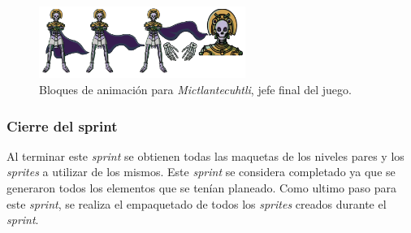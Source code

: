 \begin{figure}[h]
	\centering
	\includegraphics[width=0.6\textwidth]{03TrabajoRealizado/imagenes/Mictlantecuhtli.png}
 	\caption{Bloques de animación para \textit{Mictlantecuhtli}, jefe final del juego.}
	\label{fig:Mictlantecutli}		
\end{figure}

\subsubsection{Cierre del sprint}
Al terminar este \textit{sprint} se obtienen todas las maquetas de los niveles 
pares y los \textit{sprites} a utilizar de los mismos. Este \textit{sprint} se 
considera completado ya que se generaron todos los elementos que se tenían 
planeado. Como ultimo paso para este \textit{sprint}, se realiza el empaquetado 
de todos los \textit{sprites} creados durante el \textit{sprint}. 